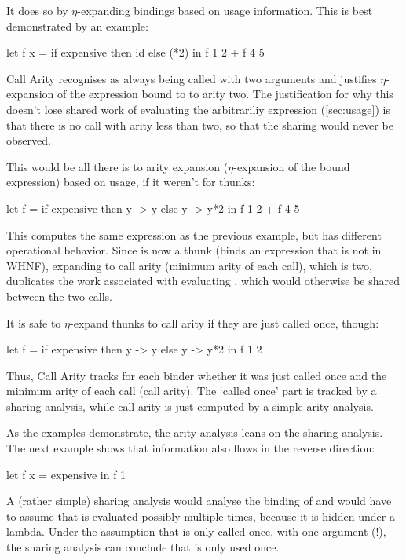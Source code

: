 It does so by $\eta$-expanding bindings based on usage information.
This is best demonstrated by an example:
\begin{haskellcode}
  let f x = 
        if expensive
        then id 
        else (*2)
  in f 1 2 + f 4 5
\end{haskellcode}

Call Arity recognises  as always being called with two arguments and justifies $\eta$-expansion of the expression bound to  to arity two.
The justification for why this doesn't lose shared work of evaluating the arbitrariliy  expression (\cf \cref{sec:usage}) is that there is no call with arity less than two, so that the sharing would never be observed.

This would be all there is to arity expansion (\eg $\eta$-expansion of the bound expression) based on usage, if it weren't for thunks:
\begin{haskellcode}
  let f =
        if expensive
        then \x y -> y
        else \x y -> y*2
  in f 1 2 + f 4 5
\end{haskellcode}

This computes the same expression as the previous example, but has different operational behavior.
Since  is now a thunk (\eg binds an expression that is not in WHNF), expanding  to call arity (minimum arity of each call), which is two, duplicates the work associated with evaluating , which would otherwise be shared between the two calls.

It is safe to $\eta$-expand thunks to call arity if they are just called once, though:
\begin{haskellcode}
  let f =
        if expensive
        then \x y -> y
        else \x y -> y*2
  in f 1 2
\end{haskellcode}

Thus, Call Arity tracks for each binder whether it was just called once and the minimum arity of each call (call arity).
The `called once' part is tracked by a sharing analysis, while call arity is just computed by a simple arity analysis.

As the examples demonstrate, the arity analysis leans on the sharing analysis.
The next example shows that information also flows in the reverse direction:
\begin{haskellcode}
  let f x = expensive
  in f 1
\end{haskellcode}

A (rather simple) sharing analysis would analyse the binding of  and would have to assume that  is evaluated possibly multiple times, because it is hidden under a lambda.
Under the assumption that  is only called once, with one argument (!), the sharing analysis can conclude that  is only used once.


